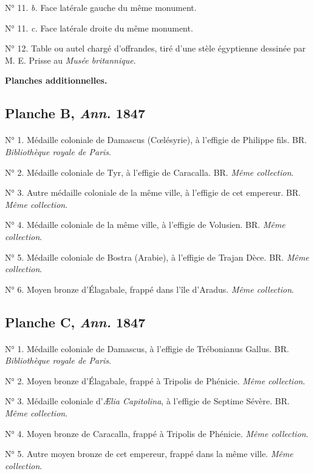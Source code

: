 \documentclass[a4paper, 11pt, oneside, polutonikogreek, french]{article}
\begin{document}
N° 11. \emph{b.} Face latérale gauche du même monument.

N° 11. \emph{c.} Face latérale droite du même monument.

N° 12. Table ou autel chargé d'offrandes, tiré d'une stèle égyptienne dessinée par M. E. Prisse au \emph{Musée britannique}.
\clearpage
\begin{center}
\textbf{Planches additionnelles.}
\end{center}
\subsection{Planche B, \emph{Ann.} 1847}
\paragraph{}
N° 1. Médaille coloniale de Damascus (Cœlésyrie), à l'effigie de Philippe fils. BR. \emph{Bibliothèque royale de Paris}.

N° 2. Médaille coloniale de Tyr, à l'effigie de Caracalla. BR. \emph{Même collection}.

N° 3. Autre médaille coloniale de la même ville, à l'effigie de cet empereur. BR. \emph{Même collection}.

N° 4. Médaille coloniale de la même ville, à l'effigie de Volusien. BR. \emph{Même collection}.

N° 5. Médaille coloniale de Bostra (Arabie), à l'effigie de Trajan Dèce. BR. \emph{Même collection}.

N° 6. Moyen bronze d'Élagabale, frappé dans l'île d'Aradus. \emph{Même collection}.
\clearpage
\subsection{Planche C, \emph{Ann.} 1847}
\paragraph{}
N° 1. Médaille coloniale de Damascus, à l'effigie de Trébonianus Gallus. BR. \emph{Bibliothèque royale de Paris}.

N° 2. Moyen bronze d'Élagabale, frappé à Tripolis de Phénicie. \emph{Même collection}.

N° 3. Médaille coloniale d'\emph{Ælia Capitolina}, à l'effigie de Septime Sévère. BR. \emph{Même collection}.

N° 4. Moyen bronze de Caracalla, frappé à Tripolis de Phénicie. \emph{Même collection}.

N° 5. Autre moyen bronze de cet empereur, frappé dans la même ville. \emph{Même collection}.
\end{document}
